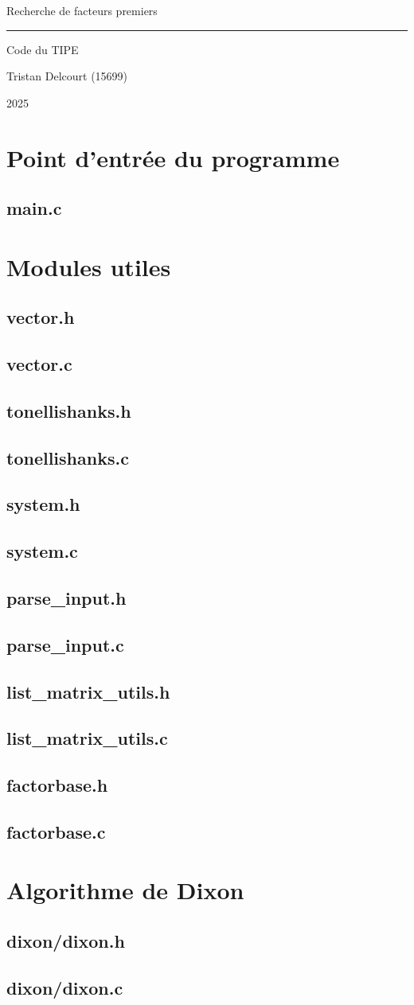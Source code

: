 \documentclass{article}
\newcommand\blankpage{%
    \null
    \thispagestyle{empty}%
    \addtocounter{page}{-1}%
    \newpage}
\newcommand{\importcode}[1]{
    \subsection{#1}
    
    \pagebreak
}
\begin{document}
\afterpage{\blankpage}
\begin{titlepage}
    \begin{center}
        \vspace*{\fill}
        
        \fontsize{60pt}{62pt}\selectfont
        Recherche de facteurs premiers

        \vspace{1cm}
        
        \hrule
        
        \vspace{1cm}
        
        \fontsize{40pt}{41pt}\selectfont
        Code du TIPE

        \vspace{1cm}

        \huge
        Tristan Delcourt (15699)

        \vspace{10cm}

        \vspace*{\fill}

        \large
        2025

    \end{center}
\end{titlepage}

\afterpage{\blankpage}
\renewcommand{\contentsname}{\huge Sommaire}
\begin{Large}
    \tableofcontents
\end{Large}
\pagebreak

\section{Point d'entrée du programme}
\importcode{main.c}


\section{Modules utiles}
\importcode{vector.h}
\importcode{vector.c}
\importcode{tonellishanks.h}
\importcode{tonellishanks.c}
\importcode{system.h}
\importcode{system.c}
\importcode{parse\_input.h}
\importcode{parse\_input.c}
\importcode{list\_matrix\_utils.h}
\importcode{list\_matrix\_utils.c}
\importcode{factorbase.h}
\importcode{factorbase.c}

\section{Algorithme de Dixon}
\importcode{dixon/dixon.h}
\importcode{dixon/dixon.c}
\end{document}
